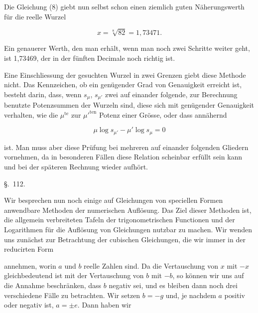 
Die Gleichung (8) giebt nun selbst schon einen ziemlich guten Näherungswerth für die reelle Wurzel

\[
x = \sqrt[8]{82} = 1{,}73471.
\]

Ein genauerer Werth, den man erhält, wenn man noch zwei Schritte weiter geht, ist 1,73469, der in der fünften Decimale noch richtig ist.

Eine Einschliessung der gesuchten Wurzel in zwei Grenzen giebt diese Methode nicht. Das Kennzeichen, ob ein genügender Grad von Genauigkeit erreicht ist, besteht darin, dass, wenn $s_\mu$, $s_{\mu'}$ zwei auf einander folgende, zur Berechnung benutzte Potenzsummen der Wurzeln sind, diese sich mit genügender Genauigkeit verhalten, wie die $\mu^{\text{te}}$ zur $\mu'^{\text{ten}}$ Potenz einer Grösse, oder dass annähernd

\[
\mu \log s_{\mu'} - \mu' \log s_\mu = 0
\]

ist. Man muss aber diese Prüfung bei mehreren auf einander folgenden Gliedern vornehmen, da in besonderen Fällen diese Relation scheinbar erfüllt sein kann und bei der späteren Rechnung wieder aufhört.

\begin{center}
\S.\ 112.


\end{center}

Wir besprechen nun noch einige auf Gleichungen von speciellen Formen anwendbare Methoden der numerischen Auflösung. Das Ziel dieser Methoden ist, die allgemein verbreiteten Tafeln der trigonometrischen Functionen und der Logarithmen für die Auflösung von Gleichungen nutzbar zu machen. Wir wenden uns zunächst zur Betrachtung der cubischen Gleichungen, die wir immer in der reducirten Form


annehmen, worin $a$ und $b$ reelle Zahlen sind. Da die Vertauschung von $x$ mit $-x$ gleichbedeutend ist mit der Vertauschung von $b$ mit $-b$, so können wir uns auf die Annahme beschränken, dass $b$ negativ sei, und es bleiben dann noch drei verschiedene Fälle zu betrachten. Wir setzen $b = -g$ und, je nachdem $a$ positiv oder negativ ist, $a = \pm e$. Dann haben wir
